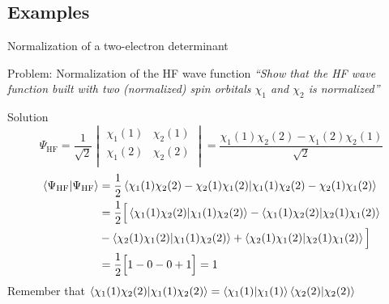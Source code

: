 \documentclass[aspectratio=169,9pt]{beamer}
\newcommand{\violet}[1]{\textcolor{hfViolet}{#1}}
\begin{document}
\subsection{Examples}
\begin{frame}{Normalization of a two-electron determinant}
	\begin{block}{Problem: Normalization of the HF wave function}
		\textit{\violet{``Show that the HF wave function built with two (normalized) spin orbitals $\chi_1$ and $\chi_2$ is normalized''}}
	\end{block}
	\pause
	\begin{block}{Solution}
		\small
		\begin{equation*}
			\Psi_\text{HF} = 
			\frac{1}{\sqrt{2}}
			\begin{vmatrix}
				\chi_1(1)	&	\chi_2(1)		\\
				\chi_1(2)	&	\chi_2(2)		\\
			\end{vmatrix}
			= \frac{ \chi_1(1) \chi_2(2) -  \chi_1(2) \chi_2(1)}{\sqrt{2}}
		\end{equation*}
		\begin{equation*}
		\begin{split}
			\braket{\Psi_\text{HF}}{\Psi_\text{HF}} 
			& = \frac{1}{2} \braket{\chi_1(1) \chi_2(2) -  \chi_2(1) \chi_1(2)}{ \chi_1(1) \chi_2(2) -  \chi_2(1) \chi_1(2) }
			\\
			& = \frac{1}{2} \Big[ 
			\braket{ \chi_1(1) \chi_2(2)  }{ \chi_1(1) \chi_2(2)  }
			- \braket{ \chi_1(1) \chi_2(2)  }{   \chi_2(1) \chi_1(2) }
			\\
			& - \braket{ \chi_2(1) \chi_1(2) }{ \chi_1(1) \chi_2(2)  }
			+ \braket{ \chi_2(1) \chi_1(2) }{   \chi_2(1) \chi_1(2) }
			\Big]
			\\
			& =  \frac{1}{2} \Big[ 1 - 0 - 0 + 1 \Big] = 1
		\end{split}
		\end{equation*}
		\alert{Remember that $\braket{\chi_1(1) \chi_2(2) }{ \chi_1(1) \chi_2(2)  } = \braket{ \chi_1(1)   }{ \chi_1(1)  } \braket{ \chi_2(2)  }{ \chi_2(2)  }$}
	\end{block}
\end{frame}
\end{document}
